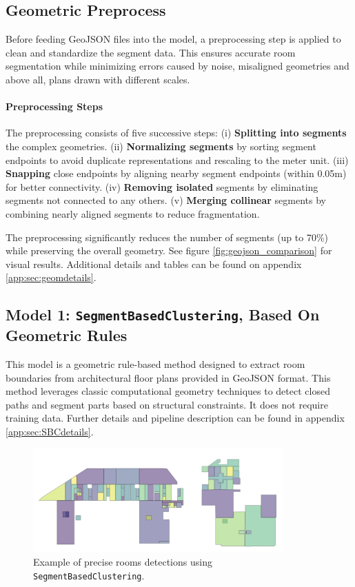 \documentclass[11pt]{article}
\begin{document}
\subsection{Geometric Preprocess}
\label{sec:geometric_preprocess}

Before feeding GeoJSON files into the model, a preprocessing step is applied to 
clean and standardize the segment data. This ensures accurate room segmentation 
while minimizing errors caused by noise, misaligned geometries and above all,
plans drawn with different scales.

\paragraph{Preprocessing Steps}
The preprocessing consists of five successive steps:
(i) \textbf{Splitting into segments} the complex geometries.
(ii) \textbf{Normalizing segments} by sorting segment endpoints to avoid duplicate representations and rescaling to the meter unit.
(iii) \textbf{Snapping} close endpoints by aligning nearby segment endpoints (within 0.05m) for better connectivity.
(iv) \textbf{Removing isolated} segments by eliminating segments not connected to any others.
(v) \textbf{Merging collinear} segments by combining nearly aligned segments to reduce fragmentation.

The preprocessing significantly reduces the number of segments (up to 70\%) while 
preserving the overall geometry. See figure \ref{fig:geojson_comparison} for visual 
results.
Additional details and tables can be found on appendix \ref{app:sec:geomdetails}.


\subsection{Model 1: \texttt{SegmentBasedClustering}, Based On Geometric Rules}

This model is a geometric rule-based method designed to extract room boundaries
from architectural floor plans provided in GeoJSON format.
This method 
leverages classic computational geometry techniques to detect closed paths
and segment parts based on structural constraints. It does not require training data.
Further details and pipeline description can be found in appendix \ref{app:sec:SBCdetails}. 


\begin{figure}[h]
    \centering
    \includegraphics[width=0.6\linewidth, height=4cm, keepaspectratio]{figures/simplemodel.png}
    \caption{Example of precise rooms detections using \texttt{SegmentBasedClustering}.}
    \label{fig:closed_paths}
\end{figure}
\end{document}

